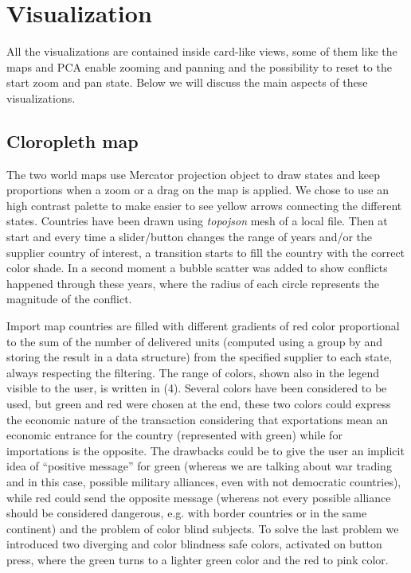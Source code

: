 \documentclass{article}
\begin{document}
\begin{multicols}{2}
\begin{figure}[tb]
\end{figure}

\section{Visualization}
All the visualizations are contained inside card-like views, some of them like the maps and PCA enable zooming and panning and the possibility to reset to the start zoom and pan state.
Below we will discuss the main aspects of these visualizations.  
\subsection{Cloropleth map}
The two world maps use Mercator projection object to draw states and keep proportions when a zoom or a drag on the map is applied. We chose to use an high contrast palette to make easier to see yellow arrows connecting the different states. Countries have been drawn using \textit{topojson} mesh of a local file. Then at start and every time a slider/button changes the range of years and/or the supplier country of interest, a transition starts to fill the country with the correct color shade. In a second moment a bubble scatter was added to show conflicts happened through these years, where the radius of each circle represents the magnitude of the conflict.  

Import map countries are filled with different gradients of red  color proportional to the sum of the number of delivered units (computed using a group by and storing the result in a data structure) from the specified supplier to each state, always respecting the filtering. The range of colors, shown also in the legend visible to the user, is written in (4). Several colors have been considered to be used, but green and red were chosen at the end, these two colors could express the economic nature of the transaction considering that exportations mean an economic entrance for the country (represented with green) while for importations is the opposite.
The drawbacks could be to give the user an implicit idea of “positive message” for green (whereas we are talking about war trading and in this case, possible military alliances, even with not democratic countries), while red could send the opposite message (whereas not every possible alliance should be considered dangerous, e.g. with border countries or in the same continent) and the problem of color blind subjects. To solve the last problem we introduced two diverging and color blindness safe colors, activated on button press, where the green turns to a lighter green color and the red to pink color.


\end{multicols}
\end{document}
